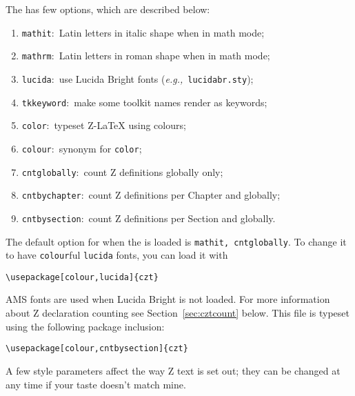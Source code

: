 \documentclass{article}
\begin{document}
The \cztstylefile{} has few options, which are described below:
%
\begin{enumerate}
   \item \texttt{mathit}:~Latin letters in italic shape when in math mode;
   \item \texttt{mathrm}:~Latin letters in roman shape when in math mode;
   \item \texttt{lucida}:~use Lucida Bright fonts (\textit{e.g.,}~\texttt{lucidabr.sty});
   \item \texttt{tkkeyword}:~make some toolkit names render as keywords;
   \item \texttt{color}:~typeset Z-\LaTeX{} using colours;
   \item \texttt{colour}:~synonym for \texttt{color};
   \item \texttt{cntglobally}:~count Z definitions globally only;
   \item \texttt{cntbychapter}:~count Z definitions per Chapter and globally;
   \item \texttt{cntbysection}:~count Z definitions per Section and globally.
\end{enumerate}
%
The default option for when the \cztstylefile{} is loaded is \texttt{mathit, cntglobally}.
To change it to have \texttt{colour}ful \texttt{lucida} fonts, you can load it with
%
\begin{verbatim}
\usepackage[colour,lucida]{czt}
\end{verbatim}
%
AMS fonts are used when Lucida Bright is not loaded. For more information about
Z declaration counting see Section~\ref{sec:cztcount} below. This file is typeset
using the following package inclusion:
%
\begin{verbatim}
\usepackage[colour,cntbysection]{czt}
\end{verbatim}

A few style parameters affect the way Z text is set out; they can be
changed at any time if your taste doesn't match mine.
\end{document}
